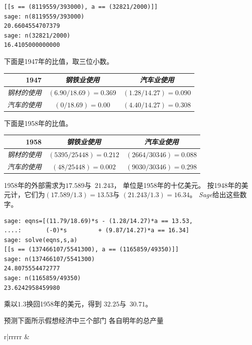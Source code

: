 \begin{exercises}
\begin{answer}
\begin{exparts}
\begin{lstlisting}
[[s == (8119559/393000), a == (32821/2000)]]
sage: n(8119559/393000)
20.6604554707379
sage: n(32821/2000)
16.4105000000000            
\end{lstlisting}
	\partsitem
          下面是1947年的比值，取三位小数。
	  \begin{center}
            \begin{tabular}{r|cc}
               1947   &\textit{钢铁业使用}  &\textit{汽车业使用}  \\ \hline
               \textit{钢材的使用}  &$(6.90/18.69)=0.369$ &$(1.28/14.27)=0.090$  \\
               \textit{汽车的使用}  &$(0/18.69)=0.00$ &$(4.40/14.27)=0.308$  
            \end{tabular}
          \end{center}
          下面是1958年的比值。
          \begin{center}
            \begin{tabular}{r|cc}
               1958           &\textit{钢铁业使用}  &\textit{汽车业使用}  \\ \hline
               \textit{钢材的使用}  &$(5395/25448)=0.212$ &$(2664/30346)=0.088$  \\
               \textit{汽车的使用}  &$(48/25448)=0.002$ &$(9030/30346)=0.298$  
            \end{tabular}
          \end{center}
	\partsitem
          1958年的外部需求为$17.589$与~$21.243$，
          单位是1958年的十亿美元。
          按1948年的美元计，它们为$(17.589/1.3)=13.53$与
          $(21.243/1.3)=16.34$。 
          \textit{Sage}给出这些数字。
\begin{lstlisting}
sage: eqns=[(11.79/18.69)*s - (1.28/14.27)*a == 13.53,
....:       (-0)*s         + (9.87/14.27)*a == 16.34]
sage: solve(eqns,s,a)
[[s == (137466107/5541300), a == (1165859/49350)]]
sage: n(137466107/5541300)
24.8075554472777
sage: n(1165859/49350)
23.6242958459980            
\end{lstlisting}
      乘以$1.3$换回1958年的美元，得到
      $32.25$与~$30.71$。
      \end{exparts}
    \end{answer}
  \item 
    预测下面所示假想经济中三个部门
    各自明年的总产量
    \begin{center}
      \begin{tabular}{r|rrrrr}
             &
\end{tabular}
\end{center}
\end{exercises}
